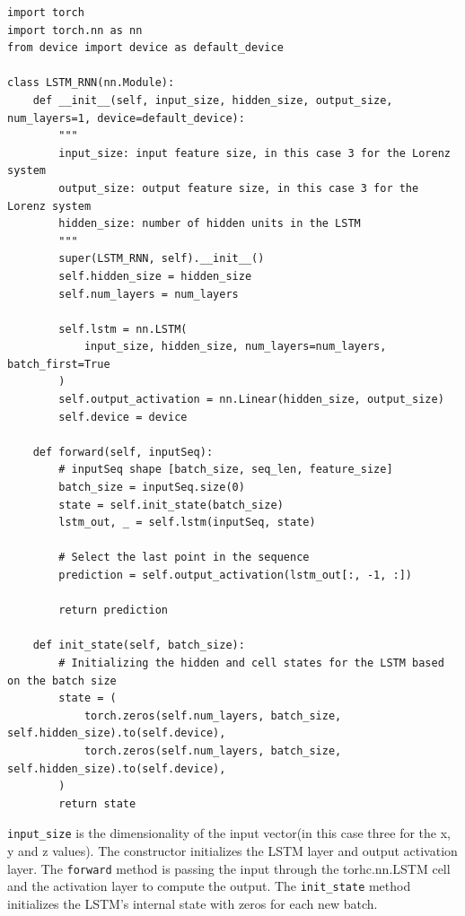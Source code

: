 \documentclass[11pt]{article}
\begin{document}
\begin{lstlisting}
import torch
import torch.nn as nn
from device import device as default_device

class LSTM_RNN(nn.Module):
    def __init__(self, input_size, hidden_size, output_size, num_layers=1, device=default_device):
        """
        input_size: input feature size, in this case 3 for the Lorenz system
        output_size: output feature size, in this case 3 for the Lorenz system
        hidden_size: number of hidden units in the LSTM
        """
        super(LSTM_RNN, self).__init__()
        self.hidden_size = hidden_size
        self.num_layers = num_layers

        self.lstm = nn.LSTM(
            input_size, hidden_size, num_layers=num_layers, batch_first=True
        )
        self.output_activation = nn.Linear(hidden_size, output_size)
        self.device = device

    def forward(self, inputSeq):
        # inputSeq shape [batch_size, seq_len, feature_size]
        batch_size = inputSeq.size(0)
        state = self.init_state(batch_size)
        lstm_out, _ = self.lstm(inputSeq, state)

        # Select the last point in the sequence
        prediction = self.output_activation(lstm_out[:, -1, :])

        return prediction

    def init_state(self, batch_size):
        # Initializing the hidden and cell states for the LSTM based on the batch size
        state = (
            torch.zeros(self.num_layers, batch_size, self.hidden_size).to(self.device),
            torch.zeros(self.num_layers, batch_size, self.hidden_size).to(self.device),
        )
        return state
\end{lstlisting}

\texttt{input\_size} is the dimensionality of the input vector(in this case three for the x, y and z values). The constructor initializes the LSTM layer and output activation layer. The \texttt{forward} method is passing the input through the torhc.nn.LSTM cell and the activation layer to compute the output. The \texttt{init\_state} method initializes the LSTM's internal state with zeros for each new batch. \\
\end{document}
